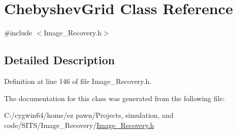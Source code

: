 \hypertarget{class_chebyshev_grid}{}\section{Chebyshev\+Grid Class Reference}
\label{class_chebyshev_grid}


{\ttfamily \#include $<$Image\+\_\+\+Recovery.\+h$>$}



\subsection{Detailed Description}


Definition at line 146 of file Image\+\_\+\+Recovery.\+h.



The documentation for this class was generated from the following file\+:\begin{DoxyCompactItemize}
\item 
C\+:/cygwin64/home/ez pawn/\+Projects, simulation, and code/\+S\+I\+T\+S/\+Image\+\_\+\+Recovery/\hyperlink{_image___recovery_8h}{Image\+\_\+\+Recovery.\+h}\end{DoxyCompactItemize}
